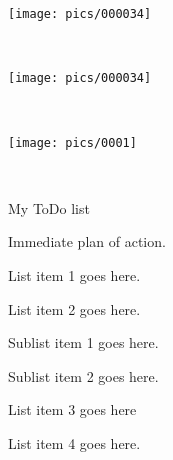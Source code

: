 \begin{eintrag}{
		\texttt{[image: pics/000034]}} 	
\end{eintrag}\\

\begin{eintrag2}{
		\texttt{[image: pics/000034]}} 	
\end{eintrag2}\\
\textbf{}


\begin{eintrag}{
		\texttt{[image: pics/0001]}} 	
\end{eintrag}\\





\usepackage{enumitem,amssymb}

	My ToDo list
	
	\begin{itemize}
		\item Immediate plan of action.
		
			\item List item 3 goes here
			\item List item 4 goes here.
		\end{todolist}
		
	\end{itemize}



\newcommand\Que[1]{%
	\leavevmode\par
	\noindent
	\textbf{\textcolor{red}{\underline{Q}}}\\#1\par}
\newcommand\Ans[2][]{%
	\leavevmode\par\noindent
	{\textbf{\textcolor{teal}{\underline{A}}}\\ \textbf{#1}#2\par}}



